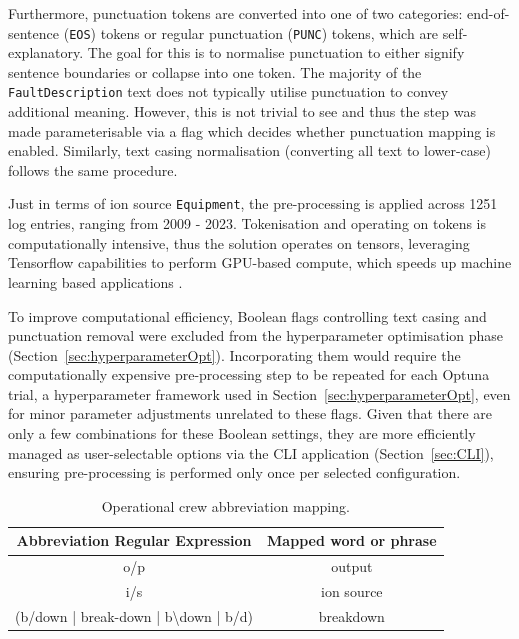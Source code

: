 \documentclass[10pt,oneside]{report}
\begin{document}
Furthermore, punctuation tokens are converted into one of two categories: end-of-sentence (\texttt{EOS}) tokens or regular punctuation (\texttt{PUNC}) tokens, which are self-explanatory. The goal for this is to normalise punctuation to either signify sentence boundaries or collapse into one token. The majority of the \texttt{FaultDescription} text does not typically utilise punctuation to convey additional meaning. However, this is not trivial to see and thus the step was made parameterisable via a flag which decides whether punctuation mapping is enabled. Similarly, text casing normalisation (converting all text to lower-case) follows the same procedure. 

Just in terms of ion source \texttt{Equipment}, the pre-processing is applied across 1251 log entries, ranging from 2009 - 2023. Tokenisation and operating on tokens is computationally intensive, thus the solution operates on tensors, leveraging Tensorflow capabilities to perform GPU-based compute, which speeds up machine learning based applications \cite{tensorflow2015whitepaper, baldini2014predicting}.

To improve computational efficiency, Boolean flags controlling text casing and punctuation removal were excluded from the hyperparameter optimisation phase (Section~\ref{sec:hyperparameterOpt}). Incorporating them would require the computationally expensive pre-processing step to be repeated for each Optuna \cite{akiba2019optuna} trial, a hyperparameter framework used in Section~\ref{sec:hyperparameterOpt}, even for minor parameter adjustments unrelated to these flags. Given that there are only a few combinations for these Boolean settings, they are more efficiently managed as user-selectable options via the CLI application (Section~\ref{sec:CLI}), ensuring pre-processing is performed only once per selected configuration.

\begin{table}[htbp]
    \fontsize{8}{12}\selectfont
    \centering
    \begin{adjustbox}{max width=\textwidth}
    \begin{tabular}{c | c}
        \toprule
        \textbf{Abbreviation Regular Expression} & \textbf{Mapped word or phrase} \\
        \midrule
        {o/p} & {output} \\
        {i/s} & {ion source} \\
        {(b/down | break-down | b\textbackslash down | b/d)} & {breakdown} \\
        \bottomrule
    \end{tabular}
    \end{adjustbox}
    \caption{Operational crew abbreviation mapping.}
    \label{tab:abbrevCrew}
\end{table}
\end{document}
